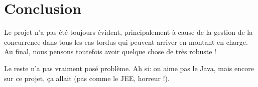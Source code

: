 \documentclass[11pt,a4paper]{article}
\begin{document}
\section{Conclusion}

Le projet n'a pas été toujours évident, principalement à cause de la gestion de la concurrence dans tous les cas tordus
qui peuvent arriver en montant en charge. Au final, nous pensons toutefois avoir quelque chose de très robuste !

Le reste n'a pas vraiment posé problème. Ah si: on aime pas le Java, mais encore sur ce projet, ça allait (pas comme le JEE, horreur !).
\end{document}
